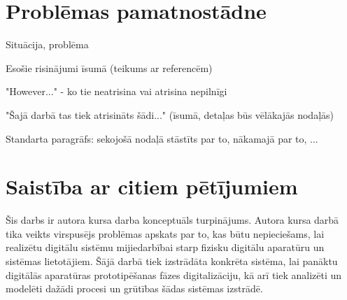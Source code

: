 \section{Problēmas pamatnostādne}




Situācija, problēma

Esošie risinājumi īsumā (teikums ar referencēm)

"However..." - ko tie neatrisina vai atrisina nepilnīgi

"Šajā darbā tas tiek atrisināts šādi..." (īsumā, detaļas būs vēlākajās nodaļās)

Standarta paragrāfs: sekojošā nodaļā stāstīts par to, nākamajā par to, ...

\section{Saistība ar citiem pētījumiem}

Šis darbs ir autora kursa darba konceptuāls turpinājums. Autora kursa darbā tika veikts virspusējs problēmas
apskats par to, kas būtu nepieciešams, lai realizētu digitālu sistēmu mijiedarbībai starp fizisku digitālu 
aparatūru un sistēmas lietotājiem. Šājā darbā tiek izstrādāta konkrēta sistēma, lai panāktu digitālās aparatūras 
prototipēšanas fāzes digitalizāciju, kā arī tiek analizēti un modelēti dažādi procesi un grūtības šādas sistēmas
izstrādē. \cite{VeinbahsKrisjanis2021}

